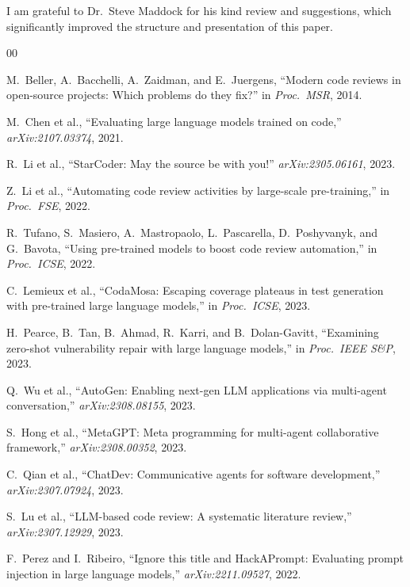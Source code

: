 \documentclass[11pt,a4paper]{article}
\begin{document}
I am grateful to Dr.\ Steve Maddock for his kind review and suggestions, which significantly improved the structure and presentation of this paper.

\begin{thebibliography}{00}

M.~Beller, A.~Bacchelli, A.~Zaidman, and E.~Juergens, ``Modern code reviews in open-source projects: Which problems do they fix?'' in \textit{Proc.\ MSR}, 2014.

M.~Chen et al., ``Evaluating large language models trained on code,'' \textit{arXiv:2107.03374}, 2021.

R.~Li et al., ``StarCoder: May the source be with you!'' \textit{arXiv:2305.06161}, 2023.

Z.~Li et al., ``Automating code review activities by large-scale pre-training,'' in \textit{Proc.\ FSE}, 2022.

R.~Tufano, S.~Masiero, A.~Mastropaolo, L.~Pascarella, D.~Poshyvanyk, and G.~Bavota, ``Using pre-trained models to boost code review automation,'' in \textit{Proc.\ ICSE}, 2022.

C.~Lemieux et al., ``CodaMosa: Escaping coverage plateaus in test generation with pre-trained large language models,'' in \textit{Proc.\ ICSE}, 2023.

H.~Pearce, B.~Tan, B.~Ahmad, R.~Karri, and B.~Dolan-Gavitt, ``Examining zero-shot vulnerability repair with large language models,'' in \textit{Proc.\ IEEE S\&P}, 2023.

Q.~Wu et al., ``AutoGen: Enabling next-gen LLM applications via multi-agent conversation,'' \textit{arXiv:2308.08155}, 2023.

S.~Hong et al., ``MetaGPT: Meta programming for multi-agent collaborative framework,'' \textit{arXiv:2308.00352}, 2023.

C.~Qian et al., ``ChatDev: Communicative agents for software development,'' \textit{arXiv:2307.07924}, 2023.

S.~Lu et al., ``LLM-based code review: A systematic literature review,'' \textit{arXiv:2307.12929}, 2023.

F.~Perez and I.~Ribeiro, ``Ignore this title and HackAPrompt: Evaluating prompt injection in large language models,'' \textit{arXiv:2211.09527}, 2022.


\end{thebibliography}
\end{document}
